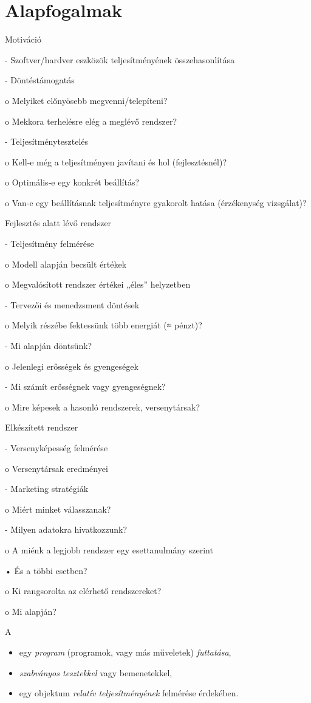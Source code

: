 \section{Alapfogalmak}


Motiváció

- Szoftver/hardver eszközök teljesítményének összehasonlítása

- Döntéstámogatás 

o Melyiket előnyösebb megvenni/telepíteni?

o Mekkora terhelésre elég a meglévő rendszer?

- Teljesítménytesztelés 

o Kell‐e még a teljesítményen javítani és hol 
(fejlesztésnél)?

o Optimális‐e egy konkrét beállítás?

o Van‐e egy beállításnak teljesítményre gyakorolt hatása 
(érzékenység vizsgálat)?

Fejlesztés alatt lévő rendszer

- Teljesítmény felmérése

o Modell alapján becsült értékek

o Megvalósított rendszer értékei „éles” helyzetben

- Tervezői és menedzsment döntések

o Melyik részébe fektessünk több energiát (≈ pénzt)? 

- Mi alapján döntsünk?

o Jelenlegi erősségek és gyengeségek

- Mi számít erősségnek vagy gyengeségnek?

o Mire képesek a hasonló rendszerek, versenytársak?

Elkészített rendszer

- Versenyképesség felmérése

o Versenytársak eredményei

- Marketing stratégiák

o Miért minket válasszanak?

- Milyen adatokra hivatkozzunk?

o A miénk a legjobb rendszer egy esettanulmány szerint

• És a többi esetben?

o Ki rangsorolta az elérhető rendszereket?

o Mi alapján?

\begin{definicio}
	A 
	\begin{itemize}
		\item egy \emph{program} (programok, vagy más műveletek) \emph{futtatása},
		\item \emph{szabványos tesztekkel} vagy bemenetekkel,
		\item egy objektum \emph{relatív teljesítményének} felmérése érdekében.
	\end{itemize}
\end{definicio}


